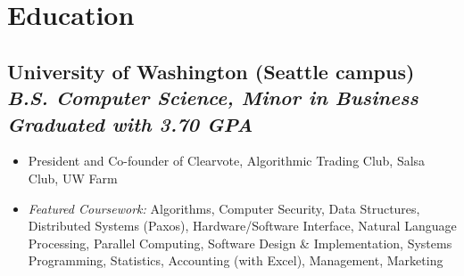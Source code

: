 \documentclass[11pt,letterpaper]{article}
\newcommand{\resumeItem}[1]{
  \item\small{#1}
}
\newcommand{\resumeSubheading}[4]{
  \vspace{-0.5em}
  \subsection{
    \textbf{#1} \hfill \textit{\small#2} \\
    \textit{\small#3} \hfill \textit{\small#4}
  }
  \vspace{-0.5em}
}
\begin{document}

\section{Education}
\resumeSubheading{University of Washington (Seattle campus)}{}{B.S. Computer Science, Minor in Business}{Graduated with 3.70 GPA}
\begin{itemize}[leftmargin=*]
  \resumeItem{President and Co-founder of Clearvote, Algorithmic Trading Club, Salsa Club, UW Farm}
  \resumeItem{\textit{Featured Coursework:} Algorithms, Computer Security, Data Structures, Distributed Systems (Paxos), Hardware/Software Interface, Natural Language Processing, Parallel Computing, Software Design \& Implementation, Systems Programming, Statistics, Accounting (with Excel), Management, Marketing}
\end{itemize}

\end{document}
